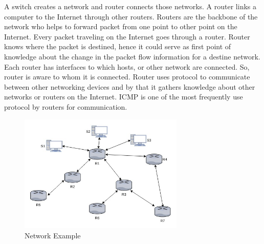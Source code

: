 \documentclass[12pt,oneside,a4paper]{article}
\begin{document}
A switch creates a network and router connects those networks. A router links a computer to the Internet through other routers. Routers are the backbone of the network who helps to forward packet from one point to other point on the Internet. Every packet traveling on the Internet goes through a router\cite{router-switch}. Router knows where the packet is destined, hence it could serve as first point of knowledge about the change in the packet flow information for a destine network. Each router has interfaces to which hosts, or other network are connected. So, router is aware to whom it is connected. Router uses protocol to communicate between other networking devices and by that it gathers knowledge about other networks or routers on the Internet. ICMP\cite{icmp} is one of the most frequently use protocol by routers for communication.\par

\begin{figure}[H]
\centering
\includegraphics[width=0.70\textwidth]{routers.jpg}
\caption{Network Example} \label{fig:routers}
\end{figure}
\end{document}
